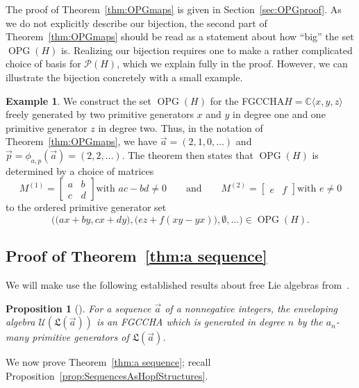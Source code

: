\documentclass[11pt]{amsart}
\newtheorem{proposition}[theorem]{Proposition}
\theoremstyle{definition}
\newtheorem{example}[theorem]{Example}
\numberwithin{equation}{section}
\def\CC{{\mathbb C}}
\newcommand{\FGCCHA}{\textsf{FGCCHA}\xspace}
\newcommand{\OPG}{\operatorname{OPG}}
\begin{document}
The proof of Theorem~\ref{thm:OPGmaps} is given in Section~\ref{sec:OPGproof}.  
As we do not explicitly describe our bijection, the second part of Theorem~\ref{thm:OPGmaps} should be read as a statement about how ``big'' the set $\OPG(H)$ is.  
Realizing our bijection requires one to make a rather complicated choice of basis for $\mathcal{P}(H)$, which we explain fully in the proof.  
However, we can illustrate the bijection concretely with a small example.  

\begin{example}
\label{ex:OPG}
We construct the set $\OPG(H)$ for the \FGCCHA $H = \CC\langle x, y, z\rangle$ freely generated by two primitive generators $x$ and $y$ in degree one and one primitive generator $z$ in degree two.  
Thus, in the notation of Theorem~\ref{thm:OPGmaps}, we have $\vec{a} = (2, 1, 0, \ldots)$ and $\vec{p} = \phi_{a, p}(\vec{a}) = (2, 2, \ldots)$. 
The theorem then states that $\OPG(H)$ is determined by a choice of matrices
\[
M^{(1)} = \begin{bmatrix}
a & b \\
c & d
\end{bmatrix}
\text{with $ac-bd \neq 0$}
\qquad\text{and}\qquad
M^{(2)} = \begin{bmatrix}
e & f
\end{bmatrix}
\text{with $e \neq 0$}
\]
to the ordered primitive generator set
\[
\Big(\big(ax+by, cx+dy\big), \big(ez + f(xy-yx)\big), \emptyset, \ldots \Big) \in \OPG(H).
\]
\end{example}

\subsection{Proof of Theorem~\ref{thm:a sequence}}
\label{sec:classificationproof}

We will make use the following established results
about free Lie algebras from~\cite{Reutenauer-FreeLieAlgebras}.

\begin{proposition}[{\cite[Theorem 0.5]{Reutenauer-FreeLieAlgebras}}]
\label{prop:LieToFree}
For a sequence $\vec{a}$ of a nonnegative integers, the enveloping algebra $\mathcal{U}(\mathfrak{L}(\vec{a}))$ is an \FGCCHA which is generated in degree $n$ by the $a_{n}$-many primitive generators of $\mathfrak{L}(\vec{a})$.
\end{proposition}

We now prove Theorem~\ref{thm:a sequence}; recall Proposition~\ref{prop:SequencesAsHopfStructures}.
\end{document}
